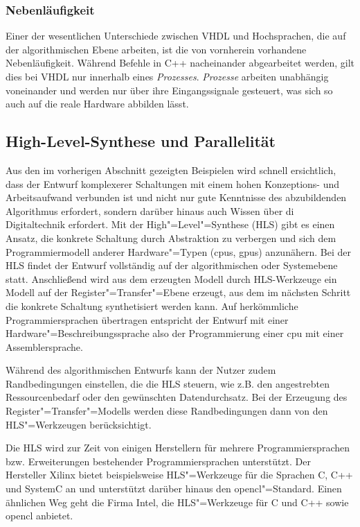 \subsubsection{Nebenläufigkeit}

Einer der wesentlichen Unterschiede zwischen VHDL und Hochsprachen, die auf
der algorithmischen Ebene arbeiten, ist die von vornherein vorhandene
Nebenläufigkeit. Während Befehle in C++ nacheinander abgearbeitet werden, gilt
dies bei VHDL nur innerhalb eines \textit{Prozesses}. \textit{Prozesse} arbeiten
unabhängig voneinander und werden nur über ihre Eingangssignale gesteuert, was
sich so auch auf die reale Hardware abbilden lässt. \cite[vgl.][25]{kesel2013}

\subsection{High-Level-Synthese und Parallelität}\label{fpga:entwicklung:hls}

Aus den im vorherigen Abschnitt gezeigten Beispielen wird schnell ersichtlich,
dass der Entwurf komplexerer Schaltungen mit einem hohen Konzeptions- und
Arbeitsaufwand verbunden ist und nicht nur gute Kenntnisse des  abzubildenden
Algorithmus erfordert, sondern darüber hinaus auch Wissen über di Digitaltechnik
erfordert. Mit der High"=Level"=Synthese (HLS) gibt es einen Ansatz, die
konkrete Schaltung durch Abstraktion zu verbergen und sich dem Programmiermodell
anderer Hardware"=Typen (\gls{cpu}s, \gls{gpu}s) anzunähern. Bei der HLS findet
der Entwurf vollständig auf der algorithmischen oder Systemebene statt.
Anschließend wird aus dem erzeugten Modell durch HLS-Werkzeuge ein Modell auf
der Register"=Transfer"=Ebene erzeugt, aus dem im nächsten Schritt die konkrete
Schaltung synthetisiert werden kann. Auf herkömmliche Programmiersprachen
übertragen entspricht der Entwurf mit einer Hardware"=Beschreibungssprache also
der Programmierung einer \gls{cpu} mit einer Assemblersprache.
\cite[vgl.][7]{hlsintro2019}

Während des algorithmischen Entwurfs kann der Nutzer zudem Randbedingungen
einstellen, die die HLS steuern, wie z.B. den angestrebten Ressourcenbedarf oder
den gewünschten Datendurchsatz. Bei der Erzeugung des
Register"=Transfer"=Modells werden diese Randbedingungen dann von den
HLS"=Werkzeugen berücksichtigt. \cite[vgl.][482]{kesel2013}

Die HLS wird zur Zeit von einigen Herstellern für mehrere Programmiersprachen
bzw. Erweiterungen bestehender Programmiersprachen unterstützt. Der Hersteller
Xilinx bietet beispielsweise HLS"=Werkzeuge für die Sprachen C, C++ und SystemC
an und unterstützt darüber hinaus den \gls{opencl}"=Standard. Einen ähnlichen
Weg geht die Firma Intel, die HLS"=Werkzeuge für C und C++ sowie \gls{opencl}
anbietet.

